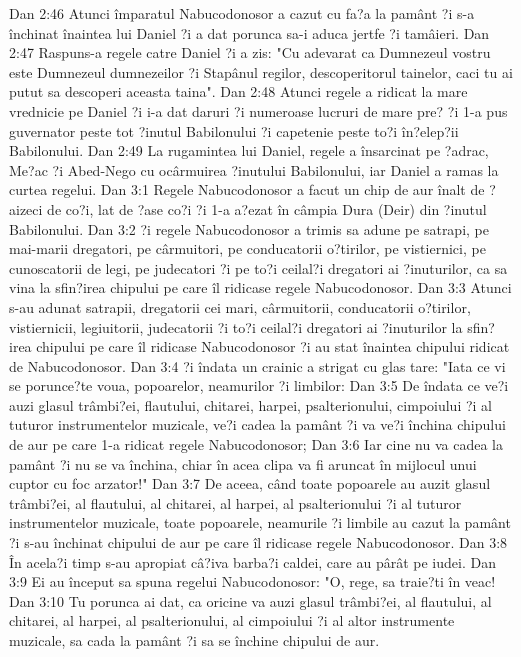 Dan 2:46  Atunci împaratul Nabucodonosor a cazut cu fa?a la pamânt ?i s-a închinat înaintea lui Daniel ?i a dat porunca sa-i aduca jertfe ?i tamâieri.
Dan 2:47  Raspuns-a regele catre Daniel ?i a zis: "Cu adevarat ca Dumnezeul vostru este Dumnezeul dumnezeilor ?i Stapânul regilor, descoperitorul tainelor, caci tu ai putut sa descoperi aceasta taina".
Dan 2:48  Atunci regele a ridicat la mare vrednicie pe Daniel ?i i-a dat daruri ?i numeroase lucruri de mare pre? ?i 1-a pus guvernator peste tot ?inutul Babilonului ?i capetenie peste to?i în?elep?ii Babilonului.
Dan 2:49  La rugamintea lui Daniel, regele a însarcinat pe ?adrac, Me?ac ?i Abed-Nego cu ocârmuirea ?inutului Babilonului, iar Daniel a ramas la curtea regelui.
Dan 3:1  Regele Nabucodonosor a facut un chip de aur înalt de ?aizeci de co?i, lat de ?ase co?i ?i 1-a a?ezat în câmpia Dura (Deir) din ?inutul Babilonului.
Dan 3:2  ?i regele Nabucodonosor a trimis sa adune pe satrapi, pe mai-marii dregatori, pe cârmuitori, pe conducatorii o?tirilor, pe vistiernici, pe cunoscatorii de legi, pe judecatori ?i pe to?i ceilal?i dregatori ai ?inuturilor, ca sa vina la sfin?irea chipului pe care îl ridicase regele Nabucodonosor.
Dan 3:3  Atunci s-au adunat satrapii, dregatorii cei mari, cârmuitorii, conducatorii o?tirilor, vistiernicii, legiuitorii, judecatorii ?i to?i ceilal?i dregatori ai ?inuturilor la sfin?irea chipului pe care îl ridicase Nabucodonosor ?i au stat înaintea chipului ridicat de Nabucodonosor.
Dan 3:4  ?i îndata un crainic a strigat cu glas tare: "Iata ce vi se porunce?te voua, popoarelor, neamurilor ?i limbilor:
Dan 3:5  De îndata ce ve?i auzi glasul trâmbi?ei, flautului, chitarei, harpei, psalterionului, cimpoiului ?i al tuturor instrumentelor muzicale, ve?i cadea la pamânt ?i va ve?i închina chipului de aur pe care 1-a ridicat regele Nabucodonosor;
Dan 3:6  Iar cine nu va cadea la pamânt ?i nu se va închina, chiar în acea clipa va fi aruncat în mijlocul unui cuptor cu foc arzator!"
Dan 3:7  De aceea, când toate popoarele au auzit glasul trâmbi?ei, al flautului, al chitarei, al harpei, al psalterionului ?i al tuturor instrumentelor muzicale, toate popoarele, neamurile ?i limbile au cazut la pamânt ?i s-au închinat chipului de aur pe care îl ridicase regele Nabucodonosor.
Dan 3:8  În acela?i timp s-au apropiat câ?iva barba?i caldei, care au pârât pe iudei.
Dan 3:9  Ei au început sa spuna regelui Nabucodonosor: "O, rege, sa traie?ti în veac!
Dan 3:10  Tu porunca ai dat, ca oricine va auzi glasul trâmbi?ei, al flautului, al chitarei, al harpei, al psalterionului, al cimpoiului ?i al altor instrumente muzicale, sa cada la pamânt ?i sa se închine chipului de aur.

